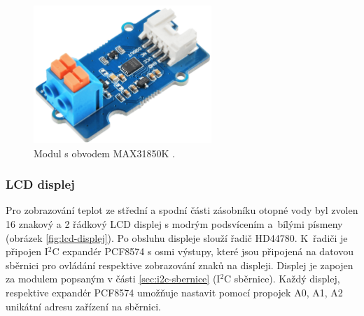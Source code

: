 \begin{figure}[H]
    \centering
    \includegraphics[width=0.6\textwidth]{images/krb/modul-max31850k-1-wire-prevodnik-termoclanku.png}
    \caption[Modul s obvodem MAX31850K.]{Modul s obvodem MAX31850K \cite{prevodnik-max31850k}.}
    \label{fig:modul-max31850k-1-wire-prevodnik-termoclanku}
\end{figure}

\subsubsection{LCD displej}
Pro zobrazování teplot ze střední a spodní části zásobníku otopné vody byl zvolen 16 znakový a 2 řádkový LCD displej s modrým podsvícením a~bílými písmeny (obrázek \ref{fig:lcd-displej}). Po obsluhu displeje slouží řadič HD44780. K~řadiči je připojen I$^2$C expandér PCF8574 s osmi výstupy, které jsou připojená na datovou sběrnici pro ovládání respektive zobrazování znaků na displeji. Displej je zapojen za modulem popsaným v části \ref{sec:i2c-sbernice} (I$^2$C sběrnice). Každý displej, respektive expandér PCF8574 umožňuje nastavit pomocí propojek A0, A1, A2 unikátní adresu zařízení na sběrnici.

